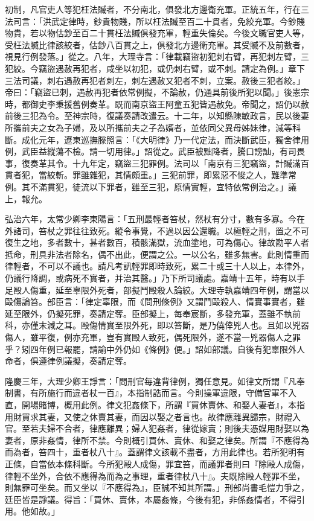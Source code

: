 初制，凡官吏人等犯枉法贓者，不分南北，俱發北方邊衛充軍。正統五年，行在三法司言：「洪武定律時，鈔貴物賤，所以枉法贓至百二十貫者，免絞充軍。今鈔賤物貴，若以物估鈔至百二十貫枉法贓俱發充軍，輕重失倫矣。今後文職官吏人等，受枉法贓比律該絞者，估鈔八百貫之上，俱發北方邊衛充軍。其受贓不及前數者，視見行例發落。」從之。八年，大理寺言：「律載竊盜初犯刺右臂，再犯刺左臂，三犯絞。今竊盜遇赦再犯者，咸坐以初犯，或仍刺右臂，或不刺。請定為例。」章下三法司議，刺右遇赦再犯者刺左，刺左遇赦又犯者不刺，立案。赦後三犯者絞。」帝曰：「竊盜已刺，遇赦再犯者依常例擬，不論赦，仍通具前後所犯以聞。」後憲宗時，都御史李秉援舊例奏革。既而南京盜王阿童五犯皆遇赦免。帝聞之，詔仍以赦前後三犯為令。至神宗時，復議奏請改遣云。十二年，以知縣陳敏政言，民以後妻所攜前夫之女為子婦，及以所攜前夫之子為婿者，並依同父異母姊妹律，減等科斷。成化元年，遼東巡撫滕照言：「《大明律》乃一代定法，而決斷武臣，獨舍律用例，武臣益縱蕩不檢。請一切用律。」詔從之。武臣被黜降者，騰口謗訕，有司畏事，復奏革其令。十九年定，竊盜三犯罪例。法司以「南京有三犯竊盜，計贓滿百貫者犯，當絞斬。罪雖雜犯，其情頗重。」三犯前罪，即累惡不悛之人，難準常例。其不滿貫犯，徒流以下罪者，雖至三犯，原情實輕，宜特依常例治之。」議上，報允。

弘治六年，太常少卿李東陽言：「五刑最輕者笞杖，然杖有分寸，數有多寡。今在外諸司，笞杖之罪往往致死。縱令事覺，不過以因公還職。以極輕之刑，置之不可復生之地，多者數十，甚者數百，積骸滿獄，流血塗地，可為傷心。律故勘平人者抵命，刑具非法者除名，偶不出此，便謂之公。一以公名，雖多無害。此則情重而律輕者，不可以不議也。請凡考訊輕罪即時致死，累二十或三十人以上，本律外，仍議行降調，或病死不實者，并治其醫。」乃下所司議處。嘉靖十五年，時有以手足毆人傷重，延至辜限外死者，部擬鬥毆殺人論絞。大理寺執嘉靖四年例，謂當以毆傷論笞。部臣言：「律定辜限，而《問刑條例》又謂鬥毆殺人、情實事實者，雖延至限外，仍擬死罪，奏請定奪。臣部擬上，每奉宸斷，多發充軍，蓋雖不執前科，亦僅末減之耳。毆傷情實至限外死，即以笞斷，是乃僥倖兇人也。且如以兇器傷人，雖平復，例亦充軍，豈有實毆人致死，偶死限外，遂不當一兇器傷人之罪乎？矧四年例已報罷，請諭中外仍如《條例》便。」詔如部議。自後有犯辜限外人命者，俱遵律例議擬，奏請定奪。

隆慶三年，大理少卿王諍言：「問刑官每違背律例，獨任意見。如律文所謂『凡奉制書，有所施行而違者杖一百』，本指制誥而言。今則操軍違限，守備官軍不入直，開場賭博，概用此例。律文犯姦條下，所謂『買休賣休、和娶人妻者』，本指用財買求其妻，又使之休賣其妻，而因以娶之者言也。故律應離異歸宗，財禮入官。至若夫婦不合者，律應離異；婦人犯姦者，律從嫁賣；則後夫憑媒用財娶以為妻者，原非姦情，律所不禁。今則概引買休、賣休、和娶之律矣。所謂『不應得為而為者，笞四十，重者杖八十』。蓋謂律文該載不盡者，方用此律也。若所犯明有正條，自當依本條科斷。今所犯毆人成傷，罪宜笞，而議罪者則曰『除毆人成傷，律輕不坐外，合依不應得為而為之事理，重者律杖八十』。夫既除毆人輕罪不坐，則無罪可坐矣。而又坐以『不應得為』，臣誠不知其所謂。」刑部尚書毛愷力爭之，廷臣皆是諍議。得旨：「買休、賣休，本屬姦條，今後有犯，非係姦情者，不得引用。他如故。」

